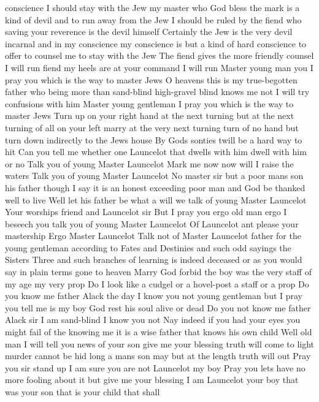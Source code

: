 conscience I should stay with the Jew my master 
who God bless the mark is a kind of devil and to 
run away from the Jew I should be ruled by the 
fiend who saving your reverence is the devil 
himself Certainly the Jew is the very devil 
incarnal and in my conscience my conscience is 
but a kind of hard conscience to offer to counsel 
me to stay with the Jew The fiend gives the more 
friendly counsel I will run fiend my heels are 
at your command I will run 
Master young man you I pray you which is the way 
to master Jews 
O heavens this is my true-begotten father 
who being more than sand-blind high-gravel blind 
knows me not I will try confusions with him 
Master young gentleman I pray you which is the way 
to master Jews 
Turn up on your right hand at the next turning but 
at the next turning of all on your left marry at 
the very next turning turn of no hand but turn 
down indirectly to the Jews house 
By Gods sonties twill be a hard way to hit Can 
you tell me whether one Launcelot 
that dwells with him dwell with him or no 
Talk you of young Master Launcelot 
Mark me now now will I raise the waters Talk you 
of young Master Launcelot 
No master sir but a poor mans son his father 
though I say it is an honest exceeding poor man 
and God be thanked well to live 
Well let his father be what a will we talk of 
young Master Launcelot 
Your worships friend and Launcelot sir 
But I pray you ergo old man ergo I beseech you 
talk you of young Master Launcelot 
Of Launcelot ant please your mastership 
Ergo Master Launcelot Talk not of Master 
Launcelot father for the young gentleman 
according to Fates and Destinies and such odd 
sayings the Sisters Three and such branches of 
learning is indeed deceased or as you would say 
in plain terms gone to heaven 
Marry God forbid the boy was the very staff of my 
age my very prop 
Do I look like a cudgel or a hovel-post a staff or 
a prop Do you know me father 
Alack the day I know you not young gentleman 
but I pray you tell me is my boy God rest his 
soul alive or dead 
Do you not know me father 
Alack sir I am sand-blind I know you not 
Nay indeed if you had your eyes you might fail of 
the knowing me it is a wise father that knows his 
own child Well old man I will tell you news of 
your son give me your blessing truth will come 
to light murder cannot be hid long a mans son 
may but at the length truth will out 
Pray you sir stand up I am sure you are not 
Launcelot my boy 
Pray you lets have no more fooling about it but 
give me your blessing I am Launcelot your boy 
that was your son that is your child that shall 
